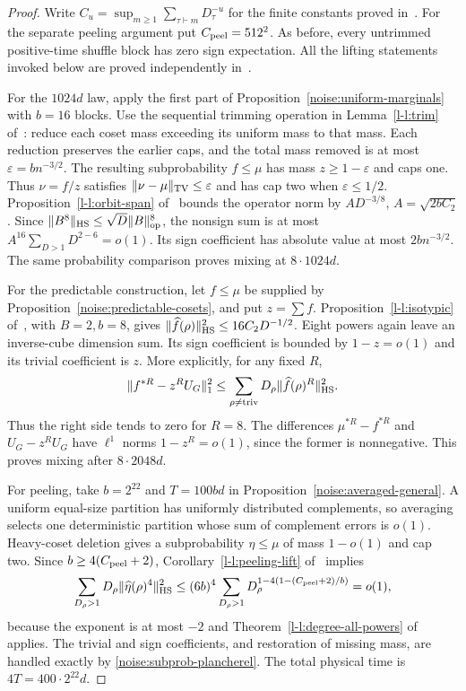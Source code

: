 \begin{proof}
Write $C_u=\sup_{m\ge1}\sum_{\tau\vdash m}D_\tau^{-u}$ for the
finite constants proved in~\cite[Theorem~\ref*{l-l:degree-all-powers}]{partialFourier}.
For the separate peeling argument put $C_{\rm peel}=512^2$.
As before, every untrimmed positive-time shuffle block has zero sign
expectation. All the lifting statements invoked below are proved
independently in~\cite{partialFourier}.

For the $1024d$ law, apply the first part of
Proposition~\ref{noise:uniform-marginals} with $b=16$ blocks.
Use the sequential trimming operation in
Lemma~\ref*{l-l:trim} of~\cite{partialFourier}: reduce each coset
mass exceeding its uniform mass to that mass. Each reduction preserves
the earlier caps, and the total mass removed is at most
$\varepsilon=bn^{-3/2}$. The resulting subprobability $f\le\mu$
has mass $z\ge1-\varepsilon$ and caps one. Thus $\nu=f/z$
satisfies $\|\nu-\mu\|_{\mathrm{TV}}\le\varepsilon$ and has cap two
when $\varepsilon\le1/2$.
Proposition~\ref*{l-l:orbit-span} of~\cite{partialFourier} bounds the operator norm by
$A D^{-3/8}$, $A=\sqrt{2bC_2}$. Since
$\|B^8\|_{\mathrm{HS}}\le\sqrt D\|B\|_{\mathrm{op}}^8$, the nonsign
sum is at most $A^{16}\sum_{D>1}D^{2-6}=o(1)$.
Its sign coefficient has absolute value at most $2bn^{-3/2}$.
The same probability comparison proves mixing at $8\cdot1024d$.

For the predictable construction, let $f\le\mu$ be supplied by
Proposition~\ref{noise:predictable-cosets}, and put $z=\sum f$.
Proposition~\ref*{l-l:isotypic} of~\cite{partialFourier}, with $B=2,b=8$, gives
$\|\widehat f(\rho)\|_{\mathrm{HS}}^2\le16C_2D^{-1/2}$.
Eight powers again leave an inverse-cube dimension sum. Its sign
coefficient is bounded by $1-z=o(1)$ and its trivial coefficient
is $z$. More explicitly, for any fixed $R$,
\begin{equation}
 \|f^{*R}-z^R U_G\|_1^2
 \le\sum_{\rho\ne\mathrm{triv}}
 D_\rho\|\widehat f(\rho)^R\|_{\mathrm{HS}}^2.
 \label{noise:subprob-plancherel}
\end{equation}
Thus the right side tends to zero for $R=8$.
The differences $\mu^{*R}-f^{*R}$ and $U_G-z^RU_G$ have
$\ell^1$ norms $1-z^R=o(1)$, since the former is nonnegative.
This proves mixing after $8\cdot2048d$.

For peeling, take $b=2^{22}$ and $T=100bd$ in
Proposition~\ref{noise:averaged-general}. A uniform equal-size
partition has uniformly distributed complements, so averaging
selects one deterministic partition whose sum of complement
errors is $o(1)$. Heavy-coset deletion gives a subprobability
$\eta\le\mu$ of mass $1-o(1)$ and cap two. Since
$b\ge4(C_{\rm peel}+2)$, Corollary~\ref*{l-l:peeling-lift} of~\cite{partialFourier} implies
\[
 \sum_{D_\rho>1}D_\rho\|\widehat\eta(\rho)^4\|_{\mathrm{HS}}^2
 \le(6b)^4\sum_{D_\rho>1}
 D_\rho^{1-4(1-(C_{\rm peel}+2)/b)}=o(1),
\]
because the exponent is at most $-2$ and
Theorem~\ref*{l-l:degree-all-powers} of~\cite{partialFourier} applies. The trivial and
sign coefficients, and restoration of missing mass, are handled
exactly by \eqref{noise:subprob-plancherel}. The total physical
time is $4T=400\cdot2^{22}d$.


\end{proof}
